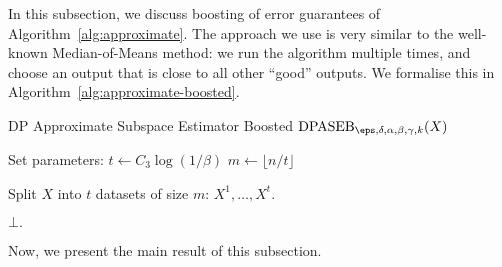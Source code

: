 In this subsection, we discuss boosting of error
guarantees of Algorithm~\ref{alg:approximate}.
The approach we use is very similar to the well-known
Median-of-Means method: we run the algorithm multiple
times, and choose an output that is close to all
other ``good'' outputs. We formalise this in
Algorithm~\ref{alg:approximate-boosted}.

\begin{algorithm}[h!]
\caption{\label{alg:approximate-boosted}DP Approximate Subspace Estimator Boosted
    $\DPASEB_{\eps, \delta, \alpha, \beta, \gamma, k}(X)$}
\vspace{5pt}

Set parameters:
    $t \gets C_3 \log(1/\beta)$ \qquad $m \gets \lfloor n/t \rfloor$
\vspace{5pt}

Split $X$ into $t$ datasets of size $m$: $X^1,\dots,X^t$.
\vspace{5pt}

\vspace{5pt}

\vspace{5pt}

\Return $\bot.$
\vspace{5pt}
\end{algorithm}

Now, we present the main result of this subsection.


